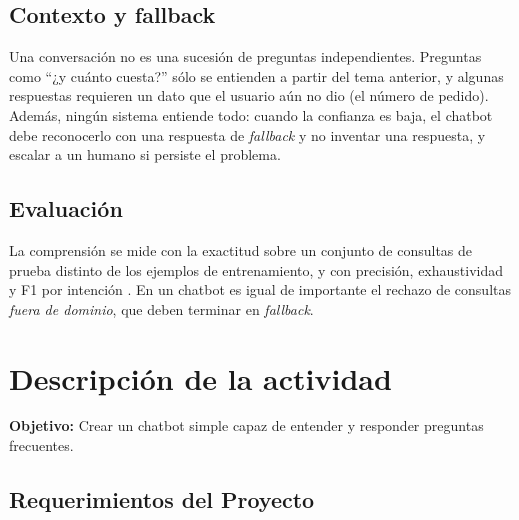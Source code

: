 \documentclass[11pt,letterpaper]{article}
\begin{document}
\subsection{Contexto y fallback}

Una conversación no es una sucesión de preguntas independientes. Preguntas como ``¿y cuánto cuesta?'' sólo se entienden a partir del tema anterior, y algunas respuestas requieren un dato que el usuario aún no dio (el número de pedido). Además, ningún sistema entiende todo: cuando la confianza es baja, el chatbot debe reconocerlo con una respuesta de \textit{fallback} y no inventar una respuesta, y escalar a un humano si persiste el problema.

\subsection{Evaluación}

La comprensión se mide con la exactitud sobre un conjunto de consultas de prueba distinto de los ejemplos de entrenamiento, y con precisión, exhaustividad y F1 por intención \parencite{geron2022}. En un chatbot es igual de importante el rechazo de consultas \emph{fuera de dominio}, que deben terminar en \textit{fallback}.

\section{Descripción de la actividad}

\textbf{Objetivo:} Crear un chatbot simple capaz de entender y responder preguntas frecuentes.

\subsection*{Requerimientos del Proyecto}
\end{document}
